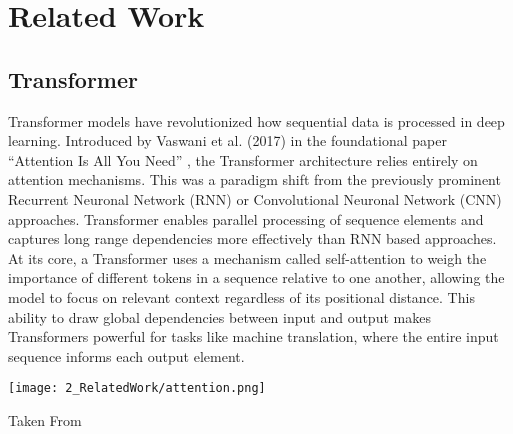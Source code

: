 \chapter{Related Work} %

\label{related_work} %

\section{Transformer}
\label{sec:rel_transformer}

Transformer models have revolutionized how sequential data is processed in deep learning. 
Introduced by Vaswani et al. (2017) in the foundational paper “Attention Is All You Need” 
\cite{attention}
, the Transformer architecture relies entirely on attention mechanisms.
This was a paradigm shift from the previously prominent Recurrent Neuronal Network (RNN) \cite{rnn} 
or Convolutional Neuronal Network (CNN) \cite{cnn} approaches.
Transformer enables parallel processing of sequence elements and captures long range dependencies 
more effectively than RNN based approaches. 
At its core, a Transformer uses a mechanism called self-attention to weigh the importance of different 
tokens in a sequence relative to one another, 
allowing the model to focus on relevant context regardless of its positional distance. 
This ability to draw global dependencies between input and output makes Transformers powerful 
for tasks like machine translation, where the entire input sequence informs each output element. 

\begin{marginfigure}[] %
    \texttt{[image: 2\_RelatedWork/attention.png]}
    \caption{\label{fig:malratios}
    Taken From \cite{attention}}
\end{marginfigure}

